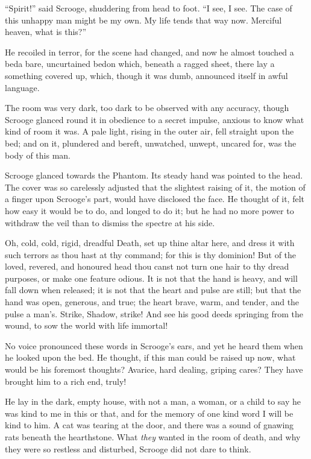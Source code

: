 \documentclass[paper=5.5in:8.5in,BCOR=5mm,twoside,DIV=calc,12pt,usegeometry]{scrbook} %
\begin{document}
\enquote{Spirit!} said Scrooge, shuddering from head to foot. \enquote{I see, I see. The case of this unhappy man might be my own. My life tends that way now. Merciful heaven, what is this?}

He recoiled in terror, for the scene had changed, and now he almost touched a bed\textemdash a bare, uncurtained bed\textemdash on which, beneath a ragged sheet, there lay a something covered up, which, though it was dumb, announced itself in awful language.

The room was very dark, too dark to be observed with any accuracy, though Scrooge glanced round it in obedience to a secret impulse, anxious to know what kind of room it was. A pale light, rising in the outer air, fell straight upon the bed; and on it, plundered and bereft, unwatched, unwept, uncared for, was the body of this man.

Scrooge glanced towards the Phantom. Its steady hand was pointed to the head. The cover was so carelessly adjusted that the slightest raising of it, the motion of a finger upon Scrooge's part, would have disclosed the face. He thought of it, felt how easy it would be to do, and longed to do it; but he had no more power to withdraw the veil than to dismiss the spectre at his side.

Oh, cold, cold, rigid, dreadful Death, set up thine altar here, and dress it with such terrors as thou hast at thy command; for this is thy dominion! But of the loved, revered, and honoured head thou canst not turn one hair to thy dread purposes, or make one feature odious. It is not that the hand is heavy, and will fall down when released; it is not that the heart and pulse are still; but that the hand was open, generous, and true; the heart brave, warm, and tender, and the pulse a man's. Strike, Shadow, strike! And see his good deeds springing from the wound, to sow the world with life immortal!

No voice pronounced these words in Scrooge's ears, and yet he heard them when he looked upon the bed. He thought, if this man could be raised up now, what would be his foremost thoughts? Avarice, hard dealing, griping cares? They have brought him to a rich end, truly!

He lay in the dark, empty house, with not a man, a woman, or a child to say he was kind to me in this or that, and for the memory of one kind word I will be kind to him. A cat was tearing at the door, and there was a sound of gnawing rats beneath the hearthstone. What \textit{they} wanted in the room of death, and why they were so restless and disturbed, Scrooge did not dare to think.
\end{document}
